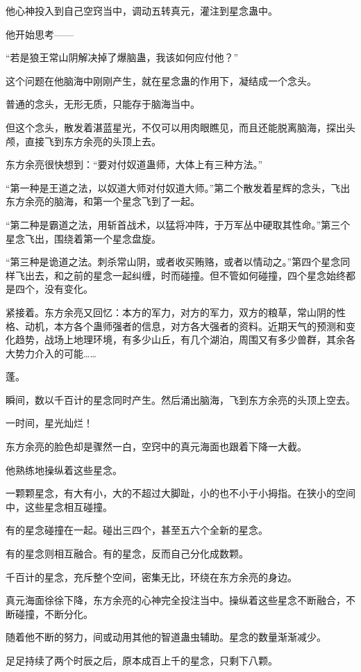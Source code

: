 \begin{this_body}
他心神投入到自己空窍当中，调动五转真元，灌注到星念蛊中。

他开始思考——

“若是狼王常山阴解决掉了爆脑蛊，我该如何应付他？”

这个问题在他脑海中刚刚产生，就在星念蛊的作用下，凝结成一个念头。

普通的念头，无形无质，只能存于脑海当中。

但这个念头，散发着湛蓝星光，不仅可以用肉眼瞧见，而且还能脱离脑海，探出头颅，直接飞到东方余亮的头顶上去。

东方余亮很快想到：“要对付奴道蛊师，大体上有三种方法。”

“第一种是王道之法，以奴道大师对付奴道大师。”第二个散发着星辉的念头，飞出东方余亮的脑海，和第一个星念飞到了一起。

“第二种是霸道之法，用斩首战术，以猛将冲阵，于万军丛中硬取其性命。”第三个星念飞出，围绕着第一个星念盘旋。

“第三种是诡道之法。刺杀常山阴，或者收买贿赂，或者以情动之。”第四个星念同样飞出去，和之前的星念一起纠缠，时而碰撞。但不管如何碰撞，四个星念始终都是四个，没有变化。

紧接着。东方余亮又回忆：本方的军力，对方的军力，双方的粮草，常山阴的性格、动机，本方各个蛊师强者的信息，对方各大强者的资料。近期天气的预测和变化趋势，战场上地理环境，有多少山丘，有几个湖泊，周围又有多少兽群，其余各大势力介入的可能……

蓬。

瞬间，数以千百计的星念同时产生。然后涌出脑海，飞到东方余亮的头顶上空去。

一时间，星光灿烂！

东方余亮的脸色却是骤然一白，空窍中的真元海面也跟着下降一大截。

他熟练地操纵着这些星念。

一颗颗星念，有大有小，大的不超过大脚趾，小的也不小于小拇指。在狭小的空间中，这些星念相互碰撞。

有的星念碰撞在一起。碰出三四个，甚至五六个全新的星念。

有的星念则相互融合。有的星念，反而自己分化成数颗。

千百计的星念，充斥整个空间，密集无比，环绕在东方余亮的身边。

真元海面徐徐下降，东方余亮的心神完全投注当中。操纵着这些星念不断融合，不断碰撞，不断分化。

随着他不断的努力，间或动用其他的智道蛊虫辅助。星念的数量渐渐减少。

足足持续了两个时辰之后，原本成百上千的星念，只剩下八颗。


\end{this_body}
